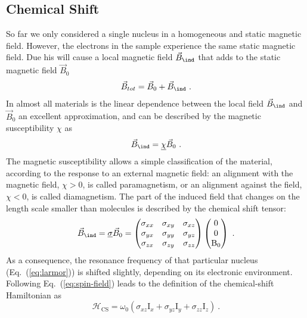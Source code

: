 \subsection{Chemical Shift}
So far we only considered a single nucleus in a homogeneous and static magnetic field. However, the electrons in the sample experience the same static magnetic field. Due his will cause a local magnetic field $\vec B_{\ind}$ that adds to the static magnetic field $\vec B_0$
\begin{align}
  \vec B_{tot} = \vec B_0 + \vec B_{\ind}~.
\end{align}
In almost all materials is the linear dependence between the local field $\vec B_{\ind}$ and $\vec B_0$ an excellent approximation, and can be described by the magnetic susceptibility $\chi$ as
\begin{align}
  \vec B_{\ind} = \underline{\chi} \vec B_{0}~.
\end{align}
The magnetic susceptibility allows a simple classification of the material, according to the response to an external magnetic field: an alignment with the magnetic field,  $\chi > 0$, is called paramagnetism, or an alignment against the field, $\chi < 0$, is called diamagnetism. 
The part of the induced field that changes on the length scale smaller than molecules is described by the chemical shift tensor:
\begin{align}
	\vec{B}_{\ind}=\underline{\sigma}\vec{B}_0 = 
	\begin{pmatrix}
	\sigma_{{xx}} & \sigma_{{xy}} & \sigma_{{xz}} \\ 
	\sigma_{{yx}} & \sigma_{{yy}} & \sigma_{{yz}} \\ 
	\sigma_{{zx}} & \sigma_{{zy}} & \sigma_{{zz}} 
	\end{pmatrix}
	\begin{pmatrix}
	0 \\
	0 \\
	\textrm{B}_0
	\end{pmatrix}
	~.
\end{align}
As a consequence, the resonance frequency of that particular nucleus (Eq.~(\ref{eq:larmor})) is shifted slightly, depending on its electronic environment.
Following Eq.~(\ref{eq:spin-field}) leads to the definition of the chemical-shift Hamiltonian as  
\begin{equation}	\mathcal{{H}}_{\text{CS}}=\omega_0\left(\sigma_{xz}{\textrm{I}}_{x}+\sigma_{yz}{\textrm{I}}_{y}+\sigma_{zz}{\textrm{I}}_{z}\right)~.
	\label{eq:CS_normal}
\end{equation}
